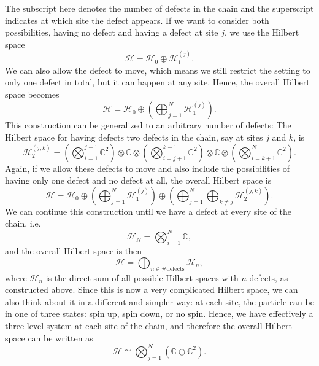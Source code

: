 \documentclass[aps,prb,twocolumn,superscriptaddress,noshowkeys]{revtex4-1}  %
\theoremstyle{plain}%
\theoremstyle{definition}
\theoremstyle{remark}
\begin{document}
The subscript here denotes the number of defects in the chain and the superscript indicates at which site the defect appears. If we want to consider both possibilities, having no defect and having a defect at site $j$, we use the Hilbert space
\begin{equation}
\mathcal{H}=\mathcal{H}_0\oplus\mathcal{H}_1^{(j)}.
\end{equation}
We can also allow the defect to move, which means we still restrict the setting to only one defect in total, but it can happen at any site. Hence, the overall Hilbert space becomes
\begin{equation}
\mathcal{H}=\mathcal{H}_0\oplus\left(\bigoplus_{j=1}^N\mathcal{H}_1^{(j)}\right).
\end{equation}
This construction can be generalized to an arbitrary number of defects: The Hilbert space for having defects two defects in the chain, say at sites $j$ and $k$, is 
\begin{equation}
\mathcal{H}_2^{(j,k)}=\left(\bigotimes_{i=1}^{j-1}\mathbb{C}^2\right)\otimes\mathbb{C}\otimes\left(\bigotimes_{i=j+1}^{k-1}\mathbb{C}^2\right)\otimes\mathbb{C}\otimes\left(\bigotimes_{i=k+1}^{N}\mathbb{C}^2\right).
\end{equation}
Again, if we allow these defects to move and also include the possibilities of having only one defect and no defect at all, the overall Hilbert space is
\begin{equation}
\mathcal{H}=\mathcal{H}_0\oplus\left(\bigoplus_{j=1}^N\mathcal{H}_1^{(j)}\right)\oplus\left(\bigoplus_{j=1}^N\bigoplus_{k\neq j}\mathcal{H}_2^{(j,k)}\right).
\end{equation}
We can continue this construction until we have a defect at every site of the chain, i.e.
\begin{equation}
\mathcal{H}_N=\bigotimes_{i=1}^N\mathbb{C},
\end{equation}
and the overall Hilbert space is then
\begin{equation}
\mathcal{H}=\bigoplus_{n\in\#\mathrm{defects}}\mathcal{H}_n,
\end{equation}
where $\mathcal{H}_n$ is the direct sum of all possible Hilbert spaces with $n$ defects, as constructed above. Since this is now a very complicated Hilbert space, we can also think about it in a different and simpler way: at each site, the particle can be in one of three states: spin up, spin down, or no spin. Hence, we have effectively a three-level system at each site of the chain, and therefore the overall Hilbert space can be written as
\begin{equation}
\mathcal{H}\cong\bigotimes_{j=1}^N\left(\mathbb{C}\oplus\mathbb{C}^2\right).
\end{equation}
\end{document}
